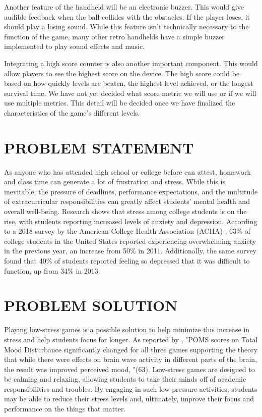 \documentclass[12pt]{article}
\begin{document}
Another feature of the handheld will be an electronic buzzer. This would give audible feedback when the ball collides with the obstacles. If the player loses, it should play a losing sound. While this feature isn't technically necessary to the function of the game, many other retro handhelds have a simple buzzer implemented to play sound effects and music.

Integrating a high score counter is also another important component. This would allow players to see the highest score on the device. The high score could be based on how quickly levels are beaten, the highest level achieved, or the longest survival time. We have not yet decided what score metric we will use or if we will use multiple metrics. This detail will be decided once we have finalized the characteristics of the game's different levels.


\newpage
\section{PROBLEM STATEMENT}
As anyone who has attended high school or college before can attest, homework and class time can generate a lot of frustration and stress. While this is inevitable, the pressure of deadlines, performance expectations, and the multitude of extracurricular responsibilities can greatly affect students' mental health and overall well-being. Research shows that stress among college students is on the rise, with students reporting increased levels of anxiety and depression. According to a 2018 survey by the American College Health Association (ACHA) \parencite{ACHA}, 63\% of college students in the United States reported experiencing overwhelming anxiety in the previous year, an increase from 50\% in 2011. Additionally, the same survey found that 40\% of students reported feeling so depressed that it was difficult to function, up from 34\% in 2013.

\newpage
\section{PROBLEM SOLUTION}
Playing low-stress games is a possible solution to help minimize this increase in stress and help students focus for longer. As reported by \parencite{peper}, "POMS scores on Total Mood Disturbance significantly changed for all three games supporting the theory that while there were effects on brain wave activity in different parts of the brain, the result was improved perceived mood, "(63). Low-stress games are designed to be calming and relaxing, allowing students to take their minds off of academic responsibilities and troubles. By engaging in such low-pressure activities, students may be able to reduce their stress levels and, ultimately, improve their focus and performance on the things that matter.
\end{document}
